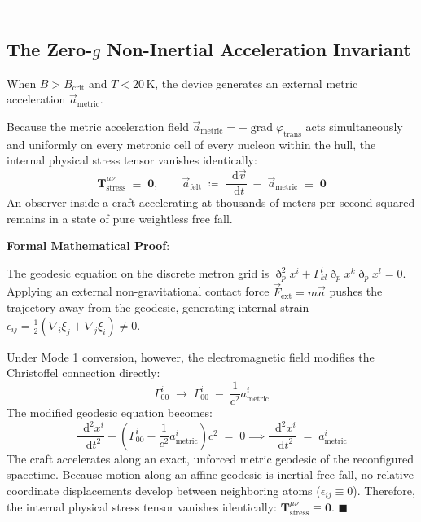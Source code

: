 \documentclass[
    12pt,
    a4paper,
    headings=normal,
    twoside=false,
    open=any,
    parskip=half
]{scrbook}
\newcommand{\ethop}{\eth}
\newcommand{\diff}{\mathop{}\!\mathrm{d}}
\newenvironment{myproof}[1][]{%
  \par\vspace{6pt}\noindent\textbf{\sffamily\color{maincolor}Formal Mathematical Proof\ifstrempty{#1}{}{ (#1)}}:\par\nopagebreak
}{%
  \penalty50\hfill\ensuremath{\blacksquare}\par\vspace{6pt}
}
\begin{document}
---

\subsection{The Zero-$g$ Non-Inertial Acceleration Invariant}

When $B > B_{\text{crit}}$ and $T < 20\,\text{K}$, the device generates an external metric acceleration $\vec{a}_{\text{metric}}$.

\begin{phystheorem}\label{thm:ch6_zero_g_invariant}
Because the metric acceleration field $\vec{a}_{\text{metric}} = -\operatorname{grad}\varphi_{\text{trans}}$ acts simultaneously and uniformly on every metronic cell of every nucleon within the hull, the internal physical stress tensor vanishes identically:
\begin{equation}
\boxed{\mathbf{T}_{\text{stress}}^{\mu\nu} \;\equiv\; \mathbf{0}, \qquad \vec{a}_{\text{felt}} \;\coloneqq\; \frac{\diff\vec{v}}{\diff t} \;-\; \vec{a}_{\text{metric}} \;\equiv\; \mathbf{0}}
\label{eq:ch6_zero_g_felt_formula}
\end{equation}
An observer inside a craft accelerating at thousands of meters per second squared remains in a state of pure weightless free fall.
\end{phystheorem}

\begin{myproof}
The geodesic equation on the discrete metron grid is $\ethop_p^2 x^i + \Gamma_{kl}^i \ethop_p x^k \ethop_p x^l = 0$. Applying an external non-gravitational contact force $\vec{F}_{\text{ext}} = m\vec{a}$ pushes the trajectory away from the geodesic, generating internal strain $\epsilon_{ij} = \frac{1}{2}(\nabla_i \xi_j + \nabla_j \xi_i) \ne 0$.

Under Mode 1 conversion, however, the electromagnetic field modifies the Christoffel connection directly:
\begin{equation*}
\Gamma_{00}^i \;\longrightarrow\; \Gamma_{00}^i \;-\; \frac{1}{c^2} a_{\text{metric}}^i
\end{equation*}
The modified geodesic equation becomes:
\begin{equation*}
\frac{\diff^2 x^i}{\diff t^2} + \left( \Gamma_{00}^i - \frac{1}{c^2} a_{\text{metric}}^i \right) c^2 \;=\; 0 \implies \frac{\diff^2 x^i}{\diff t^2} \;=\; a_{\text{metric}}^i
\end{equation*}
The craft accelerates along an exact, unforced metric geodesic of the reconfigured spacetime. Because motion along an affine geodesic is inertial free fall, no relative coordinate displacements develop between neighboring atoms ($\epsilon_{ij} \equiv 0$). Therefore, the internal physical stress tensor vanishes identically: $\mathbf{T}_{\text{stress}}^{\mu\nu} \equiv \mathbf{0}$.
\end{myproof}
\end{document}
